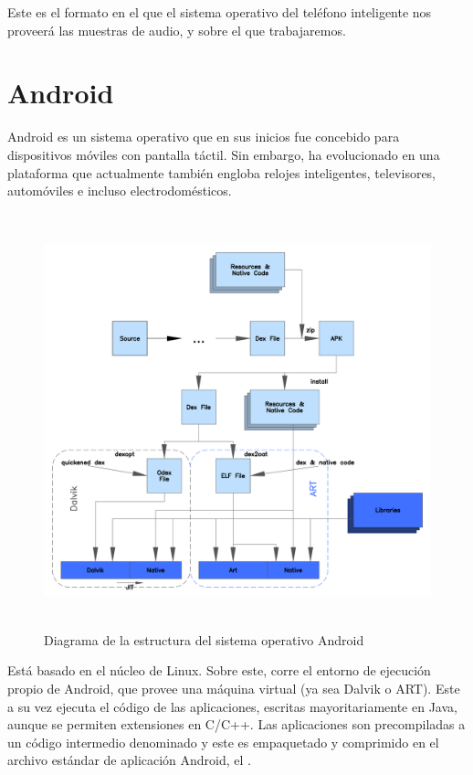 Este es el formato en el que el sistema operativo del teléfono inteligente nos proveerá las muestras de audio, y sobre el que trabajaremos.
\FloatBarrier
\section{Android}
\label{sec:AndroidIntro}
    Android es un sistema operativo que en sus inicios fue concebido para dispositivos móviles con pantalla táctil. Sin embargo, ha evolucionado en una plataforma que actualmente también engloba relojes inteligentes, televisores, automóviles e incluso electrodomésticos.

\begin{figure}[h] \centering
    \includegraphics[height=12cm]{graphs/ART_view.png} \caption{Diagrama de la estructura del sistema operativo Android\cite{androiddevguide} }\label{fig:diagrama:ART}
\end{figure}

    Está basado en el núcleo de Linux. Sobre este, corre el entorno de ejecución propio de Android, que provee una máquina virtual (ya sea Dalvik o ART). Este a su vez ejecuta el código de las aplicaciones, escritas mayoritariamente en Java, aunque se permiten extensiones en C/C++. Las aplicaciones son precompiladas a un código intermedio denominado  y este es empaquetado y comprimido en el archivo estándar de aplicación Android, el . 

